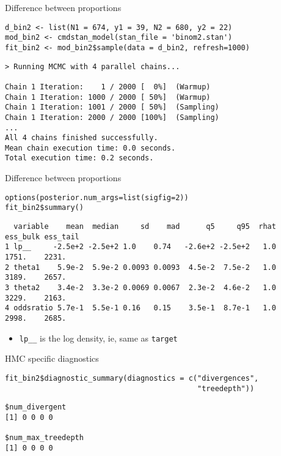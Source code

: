 \documentclass[finnish,english,t]{beamer}
\begin{document}
\begin{frame}[fragile]{Difference between proportions}
  
  {\small
\begin{verbatim}
d_bin2 <- list(N1 = 674, y1 = 39, N2 = 680, y2 = 22)
mod_bin2 <- cmdstan_model(stan_file = 'binom2.stan')
fit_bin2 <- mod_bin2$sample(data = d_bin2, refresh=1000)
\end{verbatim}
  }

  {\footnotesize
\begin{verbatim}
> Running MCMC with 4 parallel chains...

Chain 1 Iteration:    1 / 2000 [  0%]  (Warmup) 
Chain 1 Iteration: 1000 / 2000 [ 50%]  (Warmup) 
Chain 1 Iteration: 1001 / 2000 [ 50%]  (Sampling) 
Chain 1 Iteration: 2000 / 2000 [100%]  (Sampling) 
...
All 4 chains finished successfully.
Mean chain execution time: 0.0 seconds.
Total execution time: 0.2 seconds.
\end{verbatim}
  }

\end{frame}

\begin{frame}[fragile]{Difference between proportions}
  
  {\small
\begin{verbatim}
options(posterior.num_args=list(sigfig=2))
fit_bin2$summary()
\end{verbatim}
  }

  {\scriptsize
\begin{verbatim}
  variable    mean  median     sd    mad      q5     q95  rhat ess_bulk ess_tail
1 lp__     -2.5e+2 -2.5e+2 1.0    0.74   -2.6e+2 -2.5e+2   1.0    1751.    2231.
2 theta1    5.9e-2  5.9e-2 0.0093 0.0093  4.5e-2  7.5e-2   1.0    3189.    2657.
3 theta2    3.4e-2  3.3e-2 0.0069 0.0067  2.3e-2  4.6e-2   1.0    3229.    2163.
4 oddsratio 5.7e-1  5.5e-1 0.16   0.15    3.5e-1  8.7e-1   1.0    2998.    2685.
\end{verbatim}
  }

  \begin{itemize}
  \item<2-> {\tt lp\_\_} is the log density, ie, same as {\tt target}
  \end{itemize}

\end{frame}

\begin{frame}[fragile]{HMC specific diagnostics}
  
  {\small
\begin{verbatim}
fit_bin2$diagnostic_summary(diagnostics = c("divergences",
                                            "treedepth"))
\end{verbatim}
  }

  {\footnotesize
\begin{verbatim}
$num_divergent
[1] 0 0 0 0

$num_max_treedepth
[1] 0 0 0 0
\end{verbatim}
  }

\end{frame}
\end{document}
